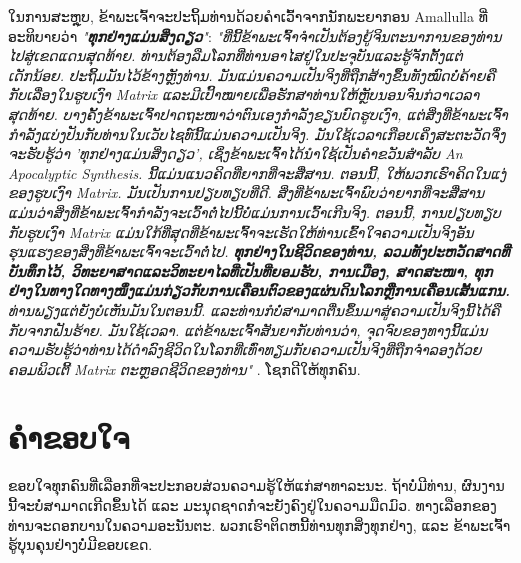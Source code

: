 \documentclass[10pt,twocolumn,letterpaper]{article}
\begin{document}
ໃນການສະຫຼຸບ, ຂ້າພະເຈົ້າຈະປະຖິ້ມທ່ານດ້ວຍຄຳເວົ້າຈາກນັກພະຍາກອນ Amallulla ທີ່ອະທິບາຍວ່າ \textit{"\textbf{ທຸກຢ່າງແມ່ນສິ່ງດຽວ}"}: \textit{"ທີ່ນີ້ຂ້າພະເຈົ້າຈຳເປັນຕ້ອງຍູ້ຈິນຕະນາການຂອງທ່ານໄປສູ່ເຂດແດນສຸດທ້າຍ. ທ່ານຕ້ອງລືມໂລກທີ່ທ່ານອາໄສຢູ່ໃນປະຈຸບັນແລະຮູ້ຈັກຕັ້ງແຕ່ເດັກນ້ອຍ. ປະຖິ້ມມັນໄວ້ຂ້າງຫຼັງທ່ານ. ມັນແມ່ນຄວາມເປັນຈິງທີ່ຖືກສ້າງຂຶ້ນທັງໝົດບໍ່ຄ້າຍຄືກັບເລື່ອງໃນຮູບເງົາ Matrix ແລະມີເປົ້າໝາຍເພື່ອຮັກສາທ່ານໃຫ້ຫຼັບນອນຈົນກ່ວາເວລາສຸດທ້າຍ. ບາງຄັ້ງຂ້າພະເຈົ້າປາດຖະໜາວ່າຕົນເອງກຳລັງຂຽນບົດຮູບເງົາ, ແຕ່ສິ່ງທີ່ຂ້າພະເຈົ້າກຳລັງແບ່ງປັນກັບທ່ານໃນເວັບໄຊທ໌ນີ້ແມ່ນຄວາມເປັນຈິງ. ມັນໃຊ້ເວລາເກືອບເຄິ່ງສະຕະວັດຈຶ່ງຈະຮັບຮູ້ວ່າ 'ທຸກຢ່າງແມ່ນສິ່ງດຽວ', ເຊິ່ງຂ້າພະເຈົ້າໄດ້ນຳໃຊ້ເປັນຄຳຂວັນສຳລັບ An Apocalyptic Synthesis. ນີ້ແມ່ນແນວຄິດທີ່ຍາກທີ່ຈະສື່ສານ. ຕອນນີ້, ໃຫ້ພວກເຮົາຄິດໃນແງ່ຂອງຮູບເງົາ Matrix. ມັນເປັນການປຽບທຽບທີ່ດີ. ສິ່ງທີ່ຂ້າພະເຈົ້າພົບວ່າຍາກທີ່ຈະສື່ສານແມ່ນວ່າສິ່ງທີ່ຂ້າພະເຈົ້າກຳລັງຈະເວົ້າຕໍ່ໄປນີ້ບໍ່ແມ່ນການເວົ້າເກີນຈິງ. ຕອນນີ້, ການປຽບທຽບກັບຮູບເງົາ Matrix ແມ່ນໃກ້ທີ່ສຸດທີ່ຂ້າພະເຈົ້າຈະເຮັດໃຫ້ທ່ານເຂົ້າໃຈຄວາມເປັນຈິງອັນຮຸນແຮງຂອງສິ່ງທີ່ຂ້າພະເຈົ້າຈະເວົ້າຕໍ່ໄປ. \textbf{ທຸກຢ່າງໃນຊີວິດຂອງທ່ານ, ລວມທັງປະຫວັດສາດທີ່ບັນທຶກໄວ້, ວິທະຍາສາດແລະວິທະຍາໄລທີ່ເປັນທີ່ຍອມຮັບ, ການເມືອງ, ສາດສະໜາ, ທຸກຢ່າງໃນທາງໃດທາງໜຶ່ງແມ່ນກ່ຽວກັບການເຄື່ອນຕົວຂອງແຜ່ນດິນໂລກຫຼືການເຄື່ອນເສັ້ນແກນ.} ທ່ານພຽງແຕ່ຍັງບໍ່ເຫັນມັນໃນຕອນນີ້. ແລະທ່ານກໍບໍ່ສາມາດຕື່ນຂຶ້ນມາສູ່ຄວາມເປັນຈິງນີ້ໄດ້ຄືກັບຈາກຝັນຮ້າຍ. ມັນໃຊ້ເວລາ. ແຕ່ຂ້າພະເຈົ້າສັນຍາກັບທ່ານວ່າ, ຈຸດຈົບຂອງທາງນີ້ແມ່ນຄວາມຮັບຮູ້ວ່າທ່ານໄດ້ດຳລົງຊີວິດໃນໂລກທີ່ເທົ່າທຽມກັບຄວາມເປັນຈິງທີ່ຖືກຈຳລອງດ້ວຍຄອມພິວເຕີ້ Matrix ຕະຫຼອດຊີວິດຂອງທ່ານ"} \cite{33,34}.
ໂຊກດີໃຫ້ທຸກຄົນ.

\section{ຄຳຂອບໃຈ}

ຂອບໃຈທຸກຄົນທີ່ເລືອກທີ່ຈະປະກອບສ່ວນຄວາມຮູ້ໃຫ້ແກ່ສາທາລະນະ. ຖ້າບໍ່ມີທ່ານ, ຜົນງານນີ້ຈະບໍ່ສາມາດເກີດຂຶ້ນໄດ້ ແລະ ມະນຸດຊາດກໍ່ຈະຍັງຄົງຢູ່ໃນຄວາມມືດມົວ. ທາງເລືອກຂອງທ່ານຈະດອກບານໃນຄວາມອະນັນຕະ. ພວກເຮົາຕິດຫນີ້ທ່ານທຸກສິ່ງທຸກຢ່າງ, ແລະ ຂ້າພະເຈົ້າຮູ້ບຸນຄຸນຢ່າງບໍ່ມີຂອບເຂດ.
\clearpage
\twocolumn

{\small
\renewcommand{\refname}{ບັນທຶກອ້າງອີງ}


}
\end{document}

